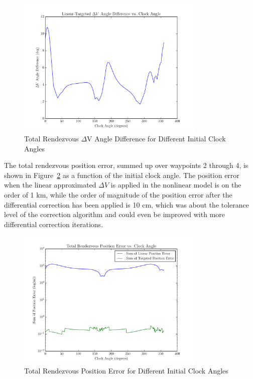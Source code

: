 \documentclass[letterpaper, preprint, paper,11pt]{AAS}	%
\begin{document}
\begin{figure}[htb] 
	\begin{center}
		\includegraphics[width=0.8\textwidth]{DV_Angle_Diff_2_1degsteps} 
		\caption{Total Rendezvous \(\Delta\)V Angle Difference for Different Initial Clock Angles}
		\label{fig:DVAngle_2}
	\end{center}
\end{figure}

The total rendezvous position error, summed up over waypoints 2 through 4, is shown in Figure~\ref{fig:PosErr_2} as a function of the initial clock angle.  The position error when the linear approximated \(\Delta V\) is applied in the nonlinear model is on the order of 1 km, while the order of magnitude of the position error after the differential correction has been applied is 10 cm, which was about the tolerance level of the correction algorithm and could even be improved with more differential correction iterations.

\clearpage 

\begin{figure}[htb] 
	\begin{center}
		\includegraphics[width=0.8\textwidth]{Log_Position_Error_2_1degsteps} 
		\caption{Total Rendezvous Position Error for Different Initial Clock Angles}
		\label{fig:PosErr_2}
	\end{center}
\end{figure}
\end{document}
